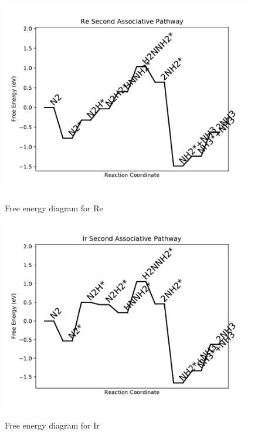 \documentclass{article}
\begin{document}
\begin{figure}
\includegraphics[width=1\linewidth]{data/plots/Re_associative_2.pdf}
\label{fig:Re_associative_2}
\caption{Free energy diagram for Re}
\end{figure}

\clearpage
\begin{figure}
\includegraphics[width=1\linewidth]{data/plots/Ir_associative_2.pdf}
\label{fig:Ir_associative_2}
\caption{Free energy diagram for Ir}
\end{figure}
\end{document}
